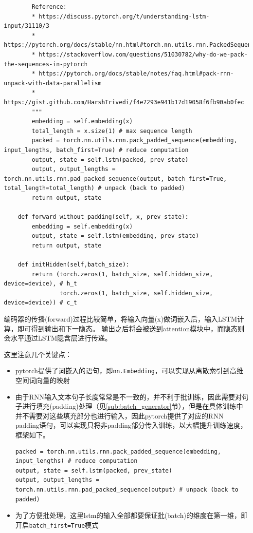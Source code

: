 \documentclass[logo,reportComp]{thesis}
\begin{document}
\begin{lstlisting}
        Reference:
        * https://discuss.pytorch.org/t/understanding-lstm-input/31110/3
        * https://pytorch.org/docs/stable/nn.html#torch.nn.utils.rnn.PackedSequence
        * https://stackoverflow.com/questions/51030782/why-do-we-pack-the-sequences-in-pytorch
        * https://pytorch.org/docs/stable/notes/faq.html#pack-rnn-unpack-with-data-parallelism
        * https://gist.github.com/HarshTrivedi/f4e7293e941b17d19058f6fb90ab0fec
        """
        embedding = self.embedding(x)
        total_length = x.size(1) # max sequence length
        packed = torch.nn.utils.rnn.pack_padded_sequence(embedding, input_lengths, batch_first=True) # reduce computation
        output, state = self.lstm(packed, prev_state)
        output, output_lengths = torch.nn.utils.rnn.pad_packed_sequence(output, batch_first=True, total_length=total_length) # unpack (back to padded)
        return output, state

    def forward_without_padding(self, x, prev_state):
        embedding = self.embedding(x)
        output, state = self.lstm(embedding, prev_state)
        return output, state

    def initHidden(self,batch_size):
        return (torch.zeros(1, batch_size, self.hidden_size, device=device), # h_t
                torch.zeros(1, batch_size, self.hidden_size, device=device)) # c_t
\end{lstlisting}

编码器的传播(forward)过程比较简单，将输入向量(x)做词嵌入后，输入LSTM计算，即可得到输出和下一隐态。
输出之后将会被送到attention模块中，而隐态则会水平通过LSTM隐含层进行传递。

这里注意几个关键点：
\begin{itemize}
\item pytorch提供了词嵌入的语句，即\verb'nn.Embedding'，可以实现从离散索引到高维空间词向量的映射
\item 由于RNN输入文本句子长度常常是不一致的，并不利于批训练，因此需要对句子进行填充(padding)处理（见\ref{sub:batch_generator}节），但是在具体训练中并不需要对这些填充部分也进行输入，因此pytorch提供了对应的RNN padding语句，可以实现只将非padding部分传入训练，以大幅提升训练速度，框架如下。
\begin{lstlisting}
packed = torch.nn.utils.rnn.pack_padded_sequence(embedding, input_lengths) # reduce computation
output, state = self.lstm(packed, prev_state)
output, output_lengths = torch.nn.utils.rnn.pad_packed_sequence(output) # unpack (back to padded)
\end{lstlisting}
\item 为了方便批处理，这里lstm的输入全部都要保证批(batch)的维度在第一维，即开启\verb'batch_first=True'模式
\end{itemize}
\end{document}
